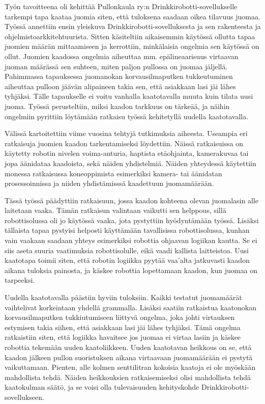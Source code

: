Työn tavoitteena oli kehittää Pullonkaula ry:n Drinkkirobotti\hyp{}sovellukselle tarkempi tapa kaataa juomia siten, että tuloksena saadaan oikea tilavuus juomaa. Työssä annettiin ensin yleiskuva Drinkkirobotti\hyp{}sovelluksesta ja sen rakenteesta ja ohjelmistoarkkitehtuurista. Sitten käsiteltiin aikaisemmin käytössä ollutta tapaa juomien määrän mittaamiseen ja kerrottiin, minkälaisia ongelmia sen käytössä on ollut. Juomien kaadossa ongelmia aiheuttaa mm. epälineaarisuus virtaavan juoman määrässä sen suhteen, miten paljon pullossa on juomaa jäljellä. Pahimmassa tapauksessa juomanokan korvausilmaputken tukkeutuminen aiheuttaa pulloon jäävän alipaineen takia sen, että asiakkaan lasi jäi lähes tyhjäksi. Tälle tapaukselle ei voitu vanhalla kaatotavalla muuta kuin tilata uusi juoma. Työssä perusteltiin, miksi kaadon tarkkuus on tärkeää, ja näihin ongelmiin pyrittiin löytämään ratkaisu työssä kehitetyllä uudella kaatotavalla.

Välissä kartoitettiin viime vuosina tehtyjä tutkimuksia aiheesta. Useampia eri ratkaisuja juomien kaadon tarkentamiseksi löydettiin. Näissä ratkaisuissa on käytetty robotin nivelen voima-anturia, haptista etäohjainta, kamerakuvaa tai jopa äänidataa kaadoista, sekä näiden yhdistelmiä. Näiden yhteydessä käytettiin monessa ratkaisussa koneoppimista esimerkiksi kamera- tai äänidatan prosessoinnissa ja niiden yhdistämisssä kaadettuun juomamäärään.

Tässä työssä päädyttiin ratkaisuun, jossa kaadon kohteena olevan juomalasin alle laitetaan vaaka. Tämän ratkaisun valintaan vaikutti sen helppous, sillä robottisolussa oli jo käytössä vaaka, jota pystyttiin hyödyntämään työssä. Lisäksi tällaista tapaa pystyisi helposti käyttämään tavallisissa robottisolussa, kunhan vain vaakaan saadaan yhteys esimerkiksi robottia ohjaavan logiikan kautta. Se ei siis aseta suuria vaatimuksia robottisolulle, eikä vaadi kallista laitteistoa. Uusi kaatotapa toimii siten, että robotin logiikka pyytää vaa'alta jatkuvasti kaadon aikana tuloksia painosta, ja käskee robottia lopettamaan kaadon, kun juomaa on tarpeeksi.

Uudella kaatotavalla päästiin hyviin tuloksiin. Kaikki testatut juomamäärät vaihtelivat korkeintaan yhdellä grammalla. Lisäksi saatiin ratkaistua kaatonokan korvausilmaputken tukkiutumiseen liittyvä ongelma, joka johti virtauksen estymisen takia siihen, että asiakkaan lasi jäi lähes tyhjäksi. Tämä ongelma ratkaistiin siten, että logiikka havaitsee jos juomaa ei virtaa lasiin ja käskee robottia tekemään uuden kaatoliikkeen. Uuden kaatotavan heikkous on se, että kaadon jälkeen pullon suoristuksen aikana virtaavaan juomamäärään ei pystytä vaikuttamaan. Pienten, alle kolmen senttilitran kokoisia kaatoja ei ole myöskään mahdollista tehdä. Näiden heikkouksien ratkaisemiseksi olisi mahdollista tehdä kaatokulman säätö, ja se voisi olla tulevaisuuden kehityskohde Drinkkirobotti\hyp{}sovellukseen.
